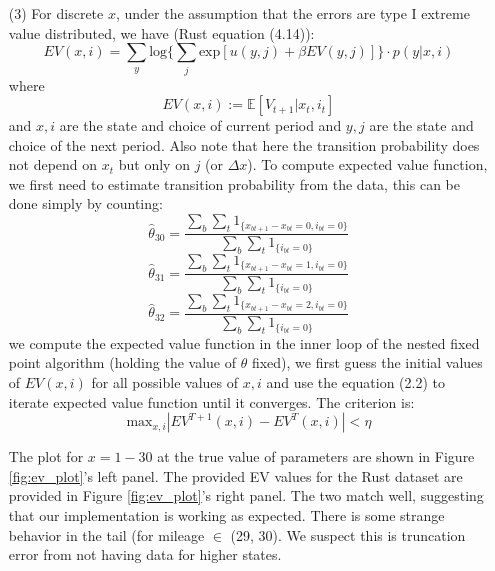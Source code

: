 \documentclass[paper=a4, fontsize=11pt]{scrartcl} %
\numberwithin{equation}{section} %
\numberwithin{figure}{section} %
\numberwithin{table}{section} %
\begin{document}
\begin{itemize}
\begin{itemize}
\item[(3)]
For discrete $x$, under the assumption that the errors are type I extreme value distributed, we have (Rust \cite{rust1987optimal} equation (4.14)):
\[EV(x,i) = \sum_y \text{log} \{\sum_{j} \text{exp}[u(y,j)+\beta EV(y,j)]\}\cdot p(y|x,i)\tag{2.2}\]
where
\[EV(x,i) := \mathbb{E}[V_{t+1}|x_t,i_t]\]
and $x, i$ are the state and choice of current period and $y,j$ are the state and choice of the next period. Also note that here the transition probability does not depend on $x_t$ but only on $j$ (or $\Delta x$). To compute expected value function, we first need to estimate transition probability from the data, this can be done simply by counting:
\[\hat{\theta}_{30} = \frac{\sum_{b}\sum_{t} 1_{\{x_{bt+1}-x_{bt}=0, i_{bt}=0\}}}{\sum_{b}\sum_{t} 1_{\{i_{bt}=0\}}}\]
\[\hat{\theta}_{31} = \frac{\sum_{b}\sum_{t} 1_{\{x_{bt+1}-x_{bt}=1, i_{bt}=0\}}}{\sum_{b}\sum_{t} 1_{\{i_{bt}=0\}}}\]
\[\hat{\theta}_{32} = \frac{\sum_{b}\sum_{t} 1_{\{x_{bt+1}-x_{bt}=2, i_{bt}=0\}}}{\sum_{b}\sum_{t} 1_{\{i_{bt}=0\}}}\]
we compute the expected value function in the inner loop of the nested fixed point algorithm (holding the value of $\theta$ fixed), we first guess the initial values of $EV(x,i)$ for all possible values of $x,i$ and use the equation (2.2) to iterate expected value function until it converges. The criterion is:
\[\text{max}_{x,i}|EV^{T+1}(x,i)-EV^T(x,i)|<\eta\]

The plot for $x=1-30$ at the true value of parameters are shown in Figure \ref{fig:ev_plot}'s left panel. The provided EV values for the Rust dataset are provided in Figure \ref{fig:ev_plot}'s right panel. The two match well, suggesting that our implementation is working as expected. There is some strange behavior in the tail (for mileage $\in$ (29, 30). We suspect this is truncation error from not having data for higher states.


\end{itemize}
\end{itemize}
\end{document}
